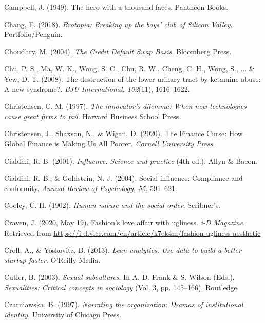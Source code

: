 \begin{thebibliography}{}

    Campbell, J. (1949). The hero with a thousand faces. Pantheon Books.   

    Chang, E. (2018). \textit{Brotopia: Breaking up the boys' club of Silicon Valley}. Portfolio/Penguin.

    Choudhry, M. (2004). \textit{The Credit Default Swap Basis}. Bloomberg Press.

    Chu, P. S., Ma, W. K., Wong, S. C., Chu, R. W., Cheng, C. H., Wong, S., ... \& Yew, D. T. (2008). The destruction of the lower urinary tract by ketamine abuse: A new syndrome?. \textit{BJU International, 102}(11), 1616–1622.

    Christensen, C. M. (1997). \textit{The innovator's dilemma: When new technologies cause great firms to fail}. Harvard Business School Press.

    Christensen, J., Shaxson, N., \& Wigan, D. (2020). The Finance Curse: How Global Finance is Making Us All Poorer. \textit{Cornell University Press}.

    Cialdini, R. B. (2001). \textit{Influence: Science and practice} (4th ed.). Allyn \& Bacon.
    
    Cialdini, R. B., \& Goldstein, N. J. (2004). Social influence: Compliance and conformity. \textit{Annual Review of Psychology, 55}, 591–621.

    Cooley, C. H. (1902). \textit{Human nature and the social order}. Scribner’s.

    Craven, J. (2020, May 19). Fashion's love affair with ugliness. \textit{i-D Magazine}. Retrieved from \url{https://i-d.vice.com/en/article/k7ek4m/fashion-ugliness-aesthetic}

    Croll, A., \& Yoskovitz, B. (2013). \textit{Lean analytics: Use data to build a better startup faster}. O’Reilly Media.

    Cutler, B. (2003). \textit{Sexual subcultures}. In A. D. Frank \& S. Wilson (Eds.), \textit{Sexualities: Critical concepts in sociology} (Vol. 3, pp. 145--166). Routledge.
    
    Czarniawska, B. (1997). \textit{Narrating the organization: Dramas of institutional identity}. University of Chicago Press.


\end{thebibliography}

